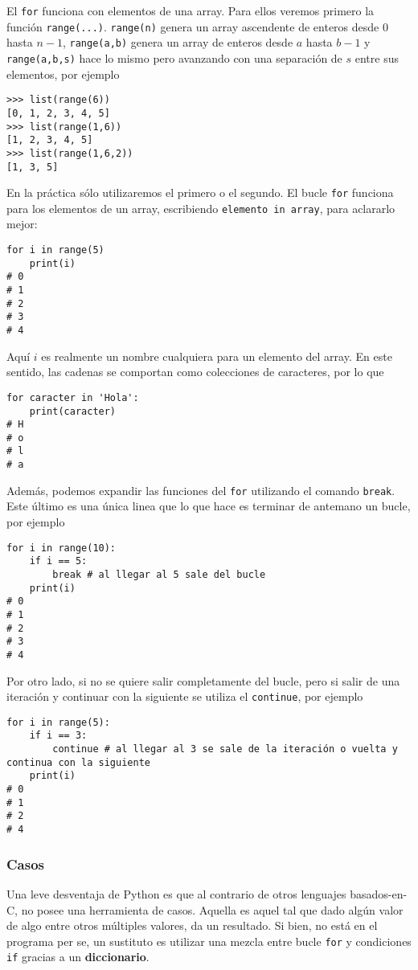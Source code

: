 \documentclass[11pt,twoside]{report}
\begin{document}
El \lstinline|for| funciona con elementos de una array. Para ellos veremos primero la función \lstinline|range(...)|. \lstinline|range(n)| genera un array ascendente de enteros desde 0 hasta $n-1$, \lstinline|range(a,b)| genera un array de enteros desde $a$ hasta $b-1$ y \lstinline|range(a,b,s)| hace lo mismo pero avanzando con una separación de $s$ entre sus elementos, por ejemplo
\begin{lstlisting}
>>> list(range(6))
[0, 1, 2, 3, 4, 5]
>>> list(range(1,6))
[1, 2, 3, 4, 5]
>>> list(range(1,6,2))
[1, 3, 5]
\end{lstlisting}
En la práctica sólo utilizaremos el primero o el segundo. El bucle \lstinline|for| funciona para los elementos de un array, escribiendo \lstinline|elemento in array|, para aclararlo mejor:
\begin{lstlisting}
for i in range(5)
	print(i)
# 0
# 1
# 2
# 3
# 4
\end{lstlisting}
Aquí $i$ es realmente un nombre cualquiera para un elemento del array. En este sentido, las cadenas se comportan como colecciones de caracteres, por lo que
\begin{lstlisting}
for caracter in 'Hola':
    print(caracter)
# H
# o
# l
# a
\end{lstlisting}
Además, podemos expandir las funciones del \lstinline|for| utilizando el comando \lstinline|break|. Este último es una única linea que lo que hace es terminar de antemano un bucle, por ejemplo
\begin{lstlisting}
for i in range(10):
	if i == 5:
		break # al llegar al 5 sale del bucle
	print(i)
# 0
# 1
# 2
# 3
# 4
\end{lstlisting}
Por otro lado, si no se quiere salir completamente del bucle, pero si salir de una iteración y continuar con la siguiente se utiliza el \lstinline|continue|, por ejemplo
\begin{lstlisting}
for i in range(5):
	if i == 3:
		continue # al llegar al 3 se sale de la iteración o vuelta y continua con la siguiente
	print(i)
# 0
# 1
# 2
# 4
\end{lstlisting}

\subsubsection*{Casos}
Una leve desventaja de Python es que al contrario de otros lenguajes basados-en-C, no posee una herramienta de casos. Aquella es aquel tal que dado algún valor de algo entre otros múltiples valores, da un resultado. Si bien, no está en el programa per se, un sustituto es utilizar una mezcla entre bucle \lstinline|for| y condiciones \lstinline|if| gracias a un \textbf{diccionario}.
\end{document}
